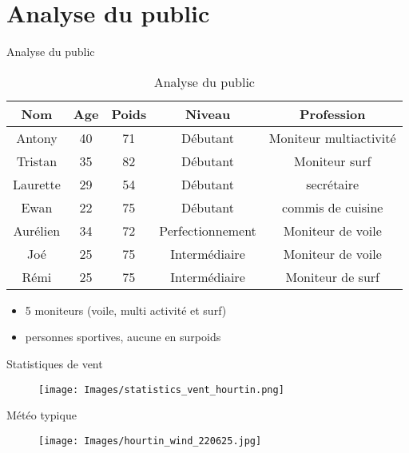 \documentclass[10pt,a4paper]{beamer}
\begin{document}
\section{Analyse du public}
\begin{frame}{Analyse du public}
\begin{table}
\begin{tabular}{|c|c|c|c|c|}
        \hline
        \textbf{Nom}& \textbf{Age} & \textbf{Poids}& \textbf{Niveau}     &  \textbf{Profession} \\ 
        \hline
       Antony      &  40         &  71           &    Débutant          & Moniteur multiactivité  \\
       \hline
        Tristan       &  35          & 82            &  Débutant           & Moniteur surf  \\
        \hline
        Laurette      &  29          & 54            &  Débutant           & secrétaire \\
        \hline
        Ewan          &  22          & 75            & Débutant            & commis de cuisine  \\
        \hline
         Aurélien      &  34          &  72           &   Perfectionnement  & Moniteur de voile \\
         \hline
        Joé           &  25          &  75           &   Intermédiaire     & Moniteur de voile \\
        \hline
        Rémi          &  25          & 75            &  Intermédiaire      &  Moniteur de surf  \\
        \hline
\end{tabular}
\caption{Analyse du public}
\end{table}
\begin{itemize}
\item  5 moniteurs (voile, multi activité et surf)
\item  personnes sportives, aucune en surpoids
\end{itemize}

\end{frame}


\begin{frame}{Statistiques de vent}
\begin{figure}
\texttt{[image: Images/statistics\_vent\_hourtin.png]} 
\end{figure}
\end{frame}
\begin{frame}{Météo typique}
\begin{figure}
\texttt{[image: Images/hourtin\_wind\_220625.jpg]} 
\end{figure}
\end{frame}
\end{document}
